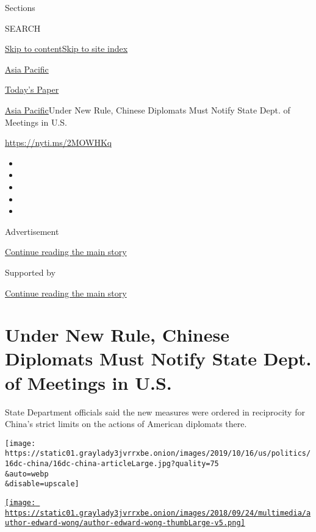 Sections

SEARCH

\protect\hyperlink{site-content}{Skip to
content}\protect\hyperlink{site-index}{Skip to site index}

\href{https://www.nytimes3xbfgragh.onion/section/world/asia}{Asia
Pacific}

\href{https://myaccount.nytimes3xbfgragh.onion/auth/login?response_type=cookie\&client_id=vi}{}

\href{https://www.nytimes3xbfgragh.onion/section/todayspaper}{Today's
Paper}

\href{/section/world/asia}{Asia Pacific}\textbar{}Under New Rule,
Chinese Diplomats Must Notify State Dept. of Meetings in U.S.

\url{https://nyti.ms/2MOWHKq}

\begin{itemize}
\item
\item
\item
\item
\item
\end{itemize}

Advertisement

\protect\hyperlink{after-top}{Continue reading the main story}

Supported by

\protect\hyperlink{after-sponsor}{Continue reading the main story}

\hypertarget{under-new-rule-chinese-diplomats-must-notify-state-dept-of-meetings-in-us}{%
\section{Under New Rule, Chinese Diplomats Must Notify State Dept. of
Meetings in
U.S.}\label{under-new-rule-chinese-diplomats-must-notify-state-dept-of-meetings-in-us}}

State Department officials said the new measures were ordered in
reciprocity for China's strict limits on the actions of American
diplomats there.

\texttt{[image: https://static01.graylady3jvrrxbe.onion/images/2019/10/16/us/politics/16dc-china/16dc-china-articleLarge.jpg?quality=75\\\&auto=webp\\\&disable=upscale]}

\href{https://www.nytimes3xbfgragh.onion/by/edward-wong}{\texttt{[image: https://static01.graylady3jvrrxbe.onion/images/2018/09/24/multimedia/author-edward-wong/author-edward-wong-thumbLarge-v5.png]}}

